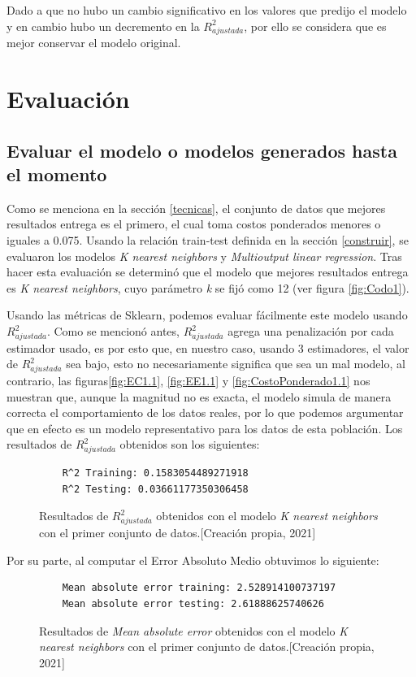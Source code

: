 \documentclass{article}
\begin{document}
Dado a que no hubo un cambio significativo en los valores que predijo el modelo y en cambio hubo un decremento en la $R^{2}_{ajustada}$, por ello se considera que es mejor conservar el modelo original. 

\section{Evaluación}
\subsection{Evaluar el modelo o modelos generados hasta el momento}

Como se menciona en la sección \ref{tecnicas}, el conjunto de datos que mejores resultados entrega es el primero, el cual toma costos ponderados menores o iguales a 0.075. Usando la relación train-test definida en la sección \ref{construir}, se evaluaron los modelos \emph{K nearest neighbors} y  \emph{Multioutput linear regression}. Tras hacer esta evaluación se determinó que el modelo que mejores resultados entrega es \emph{K nearest neighbors}, cuyo parámetro \emph{k} se fijó como 12 (ver figura \ref{fig:Codo1}).


Usando las métricas de Sklearn, podemos evaluar fácilmente este modelo usando $R^{2}_{ajustada}$. Como se mencionó antes, $R^{2}_{ajustada}$ agrega una penalización por cada estimador usado, es por esto que, en nuestro caso, usando 3 estimadores, el valor de $R^{2}_{ajustada}$ sea bajo, esto no necesariamente significa que sea un mal modelo, al contrario, las figuras\ref{fig:EC1.1}, \ref{fig:EE1.1} y \ref{fig:CostoPonderado1.1} nos muestran que, aunque la magnitud no es exacta, el modelo simula de manera correcta el comportamiento de los datos reales, por lo que podemos argumentar que en efecto es un modelo representativo para los datos de esta población. Los resultados de $R^{2}_{ajustada}$ obtenidos son los siguientes:
\begin{figure}[!ht]
    \centering
    \begin{verbatim}
    R^2 Training: 0.1583054489271918
    R^2 Testing: 0.03661177350306458
    \end{verbatim}
    \caption{Resultados de $R^2_{ajustada}$ obtenidos con el modelo \emph{K nearest neighbors} con el primer conjunto de datos.[Creación propia, 2021]}
    \label{fig:r2ajtrain}
\end{figure}


 Por su parte, al computar el Error Absoluto Medio obtuvimos lo siguiente:
\begin{figure}
    \centering
    \begin{verbatim}
    Mean absolute error training: 2.528914100737197
    Mean absolute error testing: 2.61888625740626
    \end{verbatim}
    \caption{Resultados de \emph{Mean absolute error} obtenidos con el modelo \emph{K nearest neighbors} con el primer conjunto de datos.[Creación propia, 2021]}
    \label{fig:mae}
\end{figure}
\end{document}
